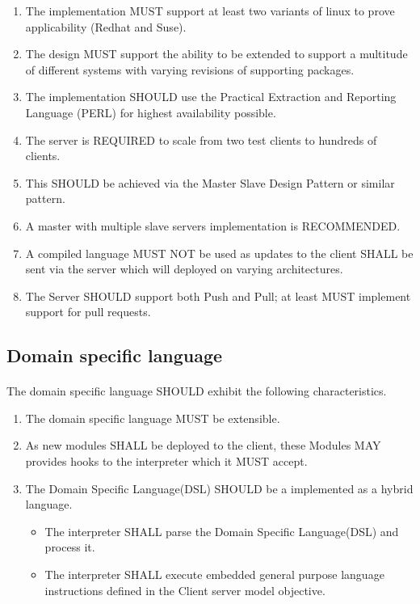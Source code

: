 					\begin{enumerate}
						\item 	The implementation MUST support at least two variants of linux to prove applicability (Redhat and Suse).
						\item 	The design MUST support the ability to be extended to support a multitude of different systems 
								with varying revisions of supporting packages. 
						\item 	The implementation SHOULD use the Practical Extraction and Reporting Language (PERL) for highest availability possible. 
						\item 	The server is REQUIRED to scale from two test clients to hundreds of clients.
						\item   This SHOULD be achieved via the Master Slave Design Pattern or similar pattern.  
						\item   A master with multiple slave servers implementation is RECOMMENDED. 
						\item 	A compiled language MUST NOT be used as updates to the client SHALL be sent via the server which will 
								deployed on varying architectures.
						\item   The Server SHOULD support both Push and Pull; at least MUST implement support for pull requests.
					\end{enumerate}

			\subsection{Domain specific language}
				\vspace{1cm}
				\paragraph{}
				The domain specific language SHOULD exhibit the following characteristics.

					\begin{enumerate}
						\item 	The domain specific language MUST be extensible.
						\item 	As new modules SHALL be deployed to the client, these Modules MAY provides hooks to the interpreter which it MUST accept.
						\item 	The Domain Specific Language(DSL) SHOULD be a implemented as a hybrid language.
						\begin{itemize}
							\item 	The interpreter SHALL parse the Domain Specific Language(DSL) and process it.
							\item 	The interpreter SHALL execute embedded general purpose language instructions defined in the Client server model objective.
						\end{itemize}
					\end{enumerate} 

